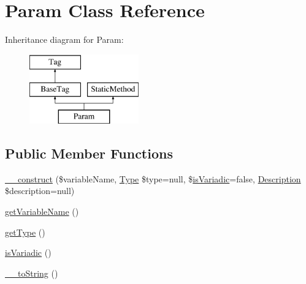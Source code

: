 \hypertarget{classphp_documentor_1_1_reflection_1_1_doc_block_1_1_tags_1_1_param}{}\section{Param Class Reference}
\label{classphp_documentor_1_1_reflection_1_1_doc_block_1_1_tags_1_1_param}
Inheritance diagram for Param\+:\begin{figure}[H]
\begin{center}
\leavevmode
\includegraphics[height=3.000000cm]{classphp_documentor_1_1_reflection_1_1_doc_block_1_1_tags_1_1_param}
\end{center}
\end{figure}
\subsection*{Public Member Functions}
\begin{DoxyCompactItemize}
\item 
\mbox{\hyperlink{classphp_documentor_1_1_reflection_1_1_doc_block_1_1_tags_1_1_param_af0e3a703b2a3c77d234572424e79b641}{\+\_\+\+\_\+construct}} (\$variable\+Name, \mbox{\hyperlink{interfacephp_documentor_1_1_reflection_1_1_type}{Type}} \$type=null, \$\mbox{\hyperlink{classphp_documentor_1_1_reflection_1_1_doc_block_1_1_tags_1_1_param_ab2aa651fb210b4868f4c2a846ab40ebb}{is\+Variadic}}=false, \mbox{\hyperlink{classphp_documentor_1_1_reflection_1_1_doc_block_1_1_description}{Description}} \$description=null)
\item 
\mbox{\hyperlink{classphp_documentor_1_1_reflection_1_1_doc_block_1_1_tags_1_1_param_a20af85a4f4041ed681b095e1427b2a1d}{get\+Variable\+Name}} ()
\item 
\mbox{\hyperlink{classphp_documentor_1_1_reflection_1_1_doc_block_1_1_tags_1_1_param_a830b5c75df72b32396701bc563fbe3c7}{get\+Type}} ()
\item 
\mbox{\hyperlink{classphp_documentor_1_1_reflection_1_1_doc_block_1_1_tags_1_1_param_ab2aa651fb210b4868f4c2a846ab40ebb}{is\+Variadic}} ()
\item 
\mbox{\hyperlink{classphp_documentor_1_1_reflection_1_1_doc_block_1_1_tags_1_1_param_a7516ca30af0db3cdbf9a7739b48ce91d}{\+\_\+\+\_\+to\+String}} ()
\end{DoxyCompactItemize}
